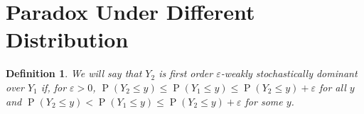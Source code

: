 \documentclass[12pt]{article}
\DeclareMathOperator*{\Prob}{P}
\newtheorem{defn}[theorem]{Definition}
\begin{document}


\section{Paradox Under Different Distribution}

\begin{defn}
We will say that $Y_2$ is first order $\varepsilon$-weakly stochastically dominant over $Y_1$ if, for $\varepsilon > 0$, 
$
  \Prob(Y_2 \leq y) \leq \Prob(Y_1 \leq y) \leq \Prob(Y_2 \leq y) + \varepsilon
$
for all $y$ and 
$
  \Prob(Y_2 \leq y) < \Prob(Y_1 \leq y) \leq \Prob(Y_2 \leq y) + \varepsilon
$
for some $y$.
\end{defn}
\end{document}
